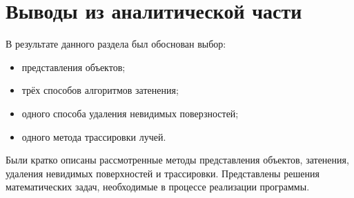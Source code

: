 \section*{Выводы из аналитической части}
В результате данного раздела был обоснован выбор:
\begin{itemize}
    \item представления объектов;
    \item трёх способов алгоритмов затенения;
    \item одного способа удаления невидимых поверзностей;
    \item одного метода трассировки лучей.
\end{itemize}

Были кратко описаны рассмотренные методы представления объектов,
затенения, удаления невидимых поверхностей и трассировки.
Представлены решения математических задач, необходимые в процессе
реализации программы.